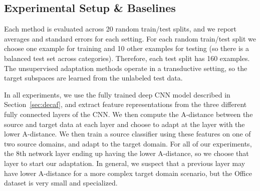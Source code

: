 \subsection{Experimental Setup \& Baselines}
 
 Each method is evaluated across 20 random train/test splits, and we report averages and standard errors for each setting. 
For each random train/test split we choose one example for training and 10 other examples for testing (so there is a balanced test set across categories). Therefore, each test split has 160 examples. The unsupervised adaptation methods operate in a transductive setting, so the target subspaces are learned from the unlabeled test data.

In all experiments, we use the fully trained deep CNN model described in Section~\ref{sec:decaf}, and extract feature representations from the three different fully connected layers of the CNN. We then compute the A-distance between the source and target data at each layer and choose to adapt at the layer with the lower A-distance. We then train a source classifier using these features on one of two source domains, and adapt to the target domain. For all of our experiments, the 8th network layer ending up having the lower A-distance, so we choose that layer to start our adaptation. In general, we suspect that a previous layer may have lower A-distance for a more complex target domain scenario, but the Office dataset is very small and specialized.







